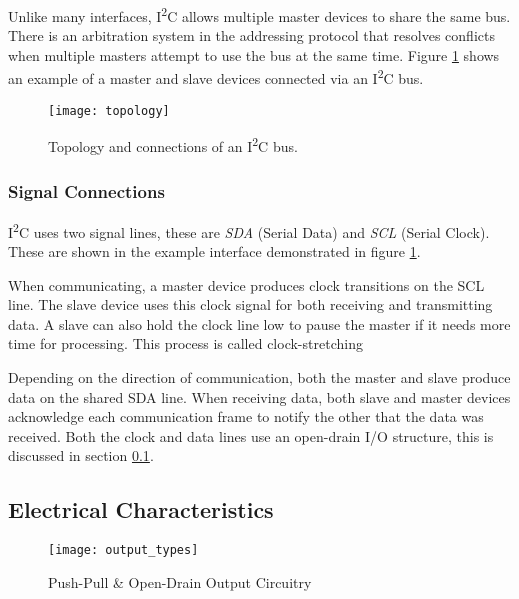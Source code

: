 \documentclass[11pt,fleqn]{book} %
\begin{document}
           Unlike many interfaces, I\textsuperscript{2}C allows multiple master devices to share the same bus. There is an arbitration system in the addressing protocol that resolves conflicts when multiple masters attempt to use the bus at the same time. Figure \ref{topology} shows an example of a master and slave devices connected via an I\textsuperscript{2}C bus. 

            \begin{figure}[]
                \centering\texttt{[image: topology]}
                \caption{Topology and connections of an I\textsuperscript{2}C bus.}
                \label{topology}
            \end{figure}
            
        \subsubsection{Signal Connections}
            I\textsuperscript{2}C uses two signal lines, these are \textit{SDA} (Serial Data) and \textit{SCL} (Serial Clock). These are shown in the example interface demonstrated in figure \ref{topology}. 
            
            When communicating, a master device produces clock transitions on the SCL line. The slave device uses this clock signal for both receiving and transmitting data. A slave can also hold the clock line low to pause the master if it needs more time for processing. This process is called clock-stretching
            
            Depending on the direction of communication, both the master and slave produce data on the shared SDA line. When receiving data, both slave and master devices acknowledge each communication frame to notify the other that the data was received.  Both the clock and data lines use an open-drain I/O structure, this is discussed in section \ref{electrical}. 
            
    \subsection{Electrical Characteristics} \label{electrical}
        \begin{figure}[]
            \centering\texttt{[image: output\_types]}
            \caption{Push-Pull \& Open-Drain Output Circuitry}
            \label{output_circuit}
        \end{figure}
        
\end{document}
